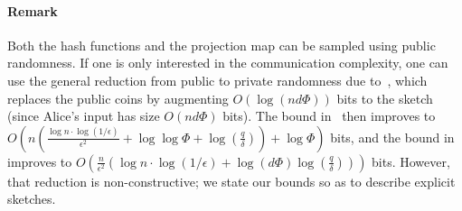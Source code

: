\paragraph{Remark} Both the hash functions and the projection map can be sampled using public randomness.
If one is only interested in the communication complexity, one can use the general reduction from public to private randomness due to~\cite{newman1991private}, which replaces the public coins by augmenting $O(\log(nd\Phi))$ bits to the sketch (since Alice's input has size $O(nd\Phi)$ bits).
The bound in~ then improves to $O\left( n\left(\frac{\log n\cdot\log(1/\epsilon)}{\epsilon^2} + \log\log\Phi + \log\left(\frac{q}{\delta}\right)\right) + \log\Phi \right)$ bits, and the bound in~ improves to $O\left(\frac{n}{\epsilon^2}\left(\log n\cdot\log(1/\epsilon) + \log(d\Phi)\log\left(\frac{q}{\delta}\right)\right) \right)$ bits.
However, that reduction is non-constructive; we state our bounds so as to describe explicit sketches.
